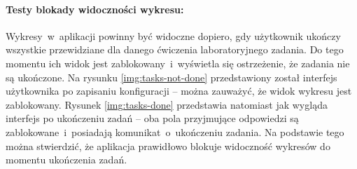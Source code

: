 \begingroup
{}
\endgroup

\paragraph{Testy blokady widoczności wykresu:} Wykresy~w~aplikacji powinny być widoczne dopiero, gdy
użytkownik ukończy wszystkie przewidziane dla danego ćwiczenia laboratoryjnego zadania. Do tego
momentu ich widok jest zablokowany~i~wyświetla się ostrzeżenie, że zadania nie są ukończone. Na
rysunku \ref{img:tasks-not-done} przedstawiony został interfejs użytkownika po zapisaniu
konfiguracji -- można zauważyć, że widok wykresu jest zablokowany. Rysunek \ref{img:tasks-done}
przedstawia natomiast jak wygląda interfejs po ukończeniu zadań -- oba pola przyjmujące odpowiedzi
są zablokowane~i~posiadają komunikat~o~ukończeniu zadania. Na podstawie tego można stwierdzić, że
aplikacja prawidłowo blokuje widoczność wykresów do momentu ukończenia zadań.

\begingroup
{}
\endgroup